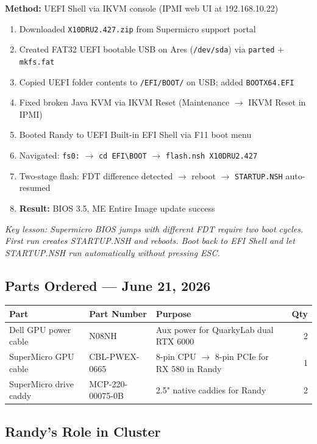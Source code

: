 \documentclass[11pt, letterpaper]{article}
\begin{document}
\textbf{Method:} UEFI Shell via IKVM console (IPMI web UI at 192.168.10.22)

\begin{enumerate}[leftmargin=*, nosep]
    \item Downloaded \texttt{X10DRU2.427.zip} from Supermicro support portal
    \item Created FAT32 UEFI bootable USB on Ares (\texttt{/dev/sda}) via \texttt{parted} + \texttt{mkfs.fat}
    \item Copied UEFI folder contents to \texttt{/EFI/BOOT/} on USB; added \texttt{BOOTX64.EFI}
    \item Fixed broken Java KVM via IKVM Reset (Maintenance $\rightarrow$ IKVM Reset in IPMI)
    \item Booted Randy to UEFI Built-in EFI Shell via F11 boot menu
    \item Navigated: \texttt{fs0:} $\rightarrow$ \texttt{cd EFI\textbackslash BOOT} $\rightarrow$ \texttt{flash.nsh X10DRU2.427}
    \item Two-stage flash: FDT difference detected $\rightarrow$ reboot $\rightarrow$ \texttt{STARTUP.NSH} auto-resumed
    \item \textbf{Result:} BIOS 3.5, ME Entire Image update success
\end{enumerate}

\textit{Key lesson: Supermicro BIOS jumps with different FDT require two boot cycles. First run creates STARTUP.NSH and reboots. Boot back to EFI Shell and let STARTUP.NSH run automatically without pressing ESC.}

\subsection{Parts Ordered — June 21, 2026}

\begin{tabularx}{\textwidth}{llXr}
\toprule
\textbf{Part} & \textbf{Part Number} & \textbf{Purpose} & \textbf{Qty} \\
\midrule
Dell GPU power cable    & N08NH              & Aux power for QuarkyLab dual RTX 6000 & 2 \\
SuperMicro GPU cable    & CBL-PWEX-0665      & 8-pin CPU $\rightarrow$ 8-pin PCIe for RX 580 in Randy & 1 \\
SuperMicro drive caddy  & MCP-220-00075-0B   & 2.5" native caddies for Randy & 2 \\
\bottomrule
\end{tabularx}

\subsection{Randy's Role in Cluster}
\end{document}
